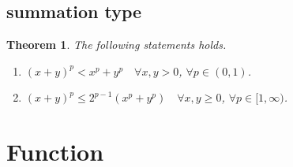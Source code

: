 \documentclass[11pt,a4paper]{report}
\newtheorem{theorem}{Theorem}[section]
\theoremstyle{definition}
\begin{document}
\subsection{summation type}

\begin{theorem}
	The following statements holds.
	\begin{enumerate}[label=(\alph*)] 
		\rm\item $(x+y)^{p} < x^{p}+y^{p} \quad \forall x, y > 0$, $\forall p \in (0, 1)$.
		\rm\item $(x + y)^{p} \leq 2^{p - 1}\left(x^{p} + y^{p}\right) \quad \forall x, y \geq 0$, $\forall p \in [1, \infty)$.
	\end{enumerate}
\end{theorem}
\section{Function}
\end{document}
